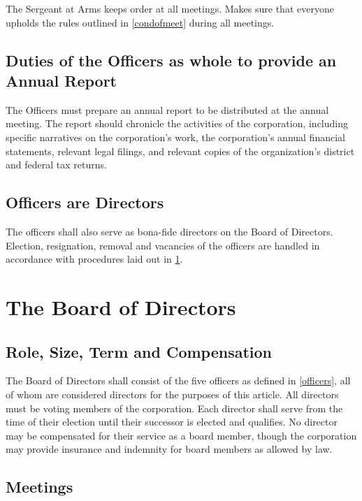 \documentclass[10pt,letterpaper,titlepage]{article}
\begin{document}
The Sergeant at Arms keeps order at all meetings.
Makes sure that everyone upholds the rules outlined in \ref{condofmeet} during
all meetings.

\subsection{Duties of the Officers as whole to provide an Annual Report}

The Officers must prepare an annual report to be distributed at the annual
meeting.
The report should chronicle the activities of the corporation, including
specific narratives on the corporation's work, the corporation's annual
financial statements, relevant legal filings, and relevant copies of the
organization's district and federal tax returns.

\subsection{Officers are Directors}

The officers shall also serve as bona-fide directors on the Board of Directors.
Election, resignation, removal and vacancies of the officers are handled in
accordance with procedures laid out in \ref{boardofdirect}.

\section{The Board of Directors}
\label{boardofdirect}

\subsection{Role, Size, Term and Compensation}

The Board of Directors shall consist of the five officers as defined in
\ref{officers}, all of whom are considered directors for the purposes of this
article.
All directors must be voting members of the corporation.
Each director shall serve from the time of their election until their successor
is elected and qualifies.
No director may be compensated for their service as a board member, though the
corporation may provide insurance and indemnity for board members as allowed by
law.

\subsection{Meetings}
\end{document}
